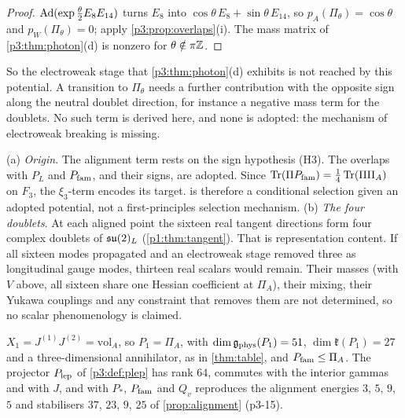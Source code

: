 \begin{proof}
$\operatorname{Ad}(\exp\tfrac\theta2E_8E_{14})$ turns $E_8$ into $\cos\theta\,E_8+\sin\theta\,E_{14}$, so $p_A(\Pi_\theta)=\cos\theta$ and $p_W(\Pi_\theta)=0$; apply \cref{p3:prop:overlaps}(i).
The mass matrix of \cref{p3:thm:photon}(d) is nonzero for $\theta\notin\pi\mathbb{Z}$.
\end{proof}

So the electroweak stage that \cref{p3:thm:photon}(d) exhibits is not reached by this potential. A transition to $\Pi_\theta$ needs a further contribution with the
opposite sign along the neutral doublet direction, for instance a negative mass term for the doublets. No such term is derived here, and none is adopted:
the mechanism of electroweak breaking is missing.

\begin{remark}
\label{p3:rem:status}
(a) \emph{Origin}. The alignment term rests on the sign hypothesis (H3). The overlaps with $P_L$ and $P_{\rm fam}$, and their signs, are adopted. Since
$\operatorname{Tr}(\Pi P_{\rm fam})=\tfrac14\operatorname{Tr}(\Pi\Pi_A)$ on $F_3$, the $\xi_3$-term encodes its target.  is therefore a conditional selection given an
adopted potential, not a first-principles selection mechanism. (b) \emph{The four doublets}. At each aligned point the sixteen real tangent directions
form four complex doublets of $\mathfrak{su}(2)_L$ (\cref{p1:thm:tangent}). That is representation content. If all sixteen modes propagated and an electroweak stage removed
three as longitudinal gauge modes, thirteen real scalars would remain. Their masses (with $V$ above, all sixteen share one Hessian coefficient at $\Pi_A$), their
mixing, their Yukawa couplings and any constraint that removes them are not determined, so no scalar phenomenology is claimed.
\end{remark}

\begin{proposition}
\label{p3:prop:restated}
$X_1=J^{(1)}J^{(2)}=\mathrm{vol}_A$, so $P_1=\Pi_A$, with $\dim\mathfrak g_{\rm phys}(P_1)=51$, $\dim\mathfrak k(P_1)=27$ and a three-dimensional annihilator, as in
\cref{thm:table}, and $P_{\rm fam}\le\Pi_A$. The projector $P_{\rm lep}$ of \cref{p3:def:plep} has rank $64$, commutes with the interior gammas and with $J$, and with $P_*$,
$P_{\rm fam}$ and $Q_v$ reproduces the alignment energies $3$, $5$, $9$, $5$ and stabilisers $37$, $23$, $9$, $25$ of \cref{prop:alignment} (p3-15).
\end{proposition}

